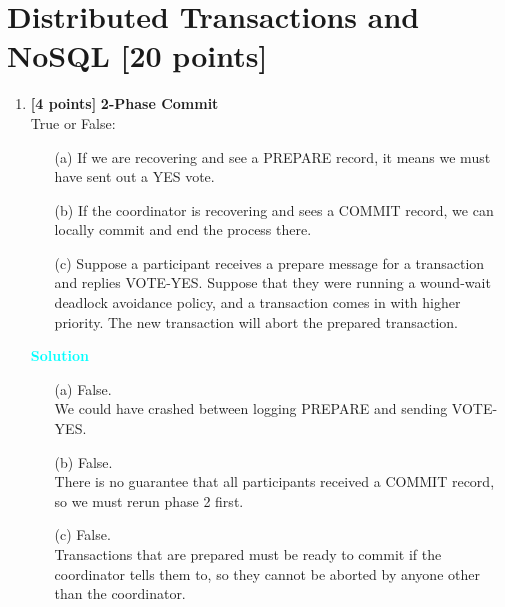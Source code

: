 \documentclass[10pt]{article}
\newenvironment{solution}
    { \begin{mdframed}[backgroundcolor=gray!10] \textcolor{cyan}{\textbf{Solution}} \\}
    {  \end{mdframed}}
\begin{document}
\newpage
\section{Distributed Transactions and NoSQL \textbf{[20 points]}}

\begin{enumerate}
	\item \textbf{[4 points]} \textbf{2-Phase Commit} \\
	      True or False: \\
	      \begin{itemize}
		      \item[(a)] If we are recovering and see a PREPARE record, it means we must have sent out a YES vote.
		      \item[(b)] If the coordinator is recovering and sees a COMMIT record, we can locally commit and end the process there.
		      \item[(c)] Suppose a participant receives a prepare message for a transaction and replies VOTE-YES.
		            Suppose that they were running a wound-wait deadlock avoidance policy, and a transaction
		            comes in with higher priority. The new transaction will abort the prepared transaction.
	      \end{itemize}
	      \begin{solution}
		      \begin{itemize}
			      \item[(a)] False. \\
			            We could have crashed between logging PREPARE and sending VOTE-YES.
			      \item[(b)] False. \\
			            There is no guarantee that all participants received a COMMIT record, so we must rerun phase 2 first.
			      \item[(c)] False. \\
			            Transactions that are prepared must be ready to commit if the coordinator tells them
			            to, so they cannot be aborted by anyone other than the coordinator.
		      \end{itemize}
	      \end{solution}


\end{enumerate}
\end{document}
